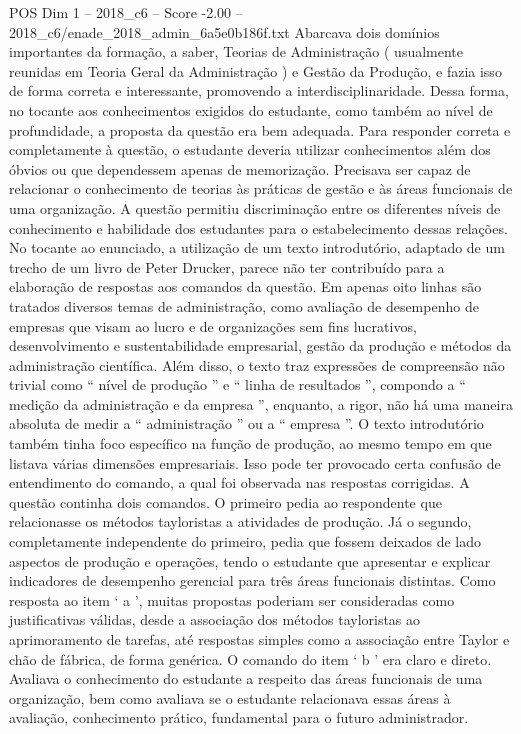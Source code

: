 \begin{textsample}{POS Dim 1 – 2018\_c6 – Score -2.00 – 2018\_c6/enade\_2018\_admin\_6a5e0b186f.txt}
Abarcava dois domínios importantes da formação, a saber, Teorias de Administração ( usualmente reunidas em Teoria Geral da Administração ) e Gestão da Produção, e fazia isso de forma correta e interessante, promovendo a interdisciplinaridade.
Dessa forma, no tocante aos conhecimentos exigidos do estudante, como também ao nível de profundidade, a proposta da questão era bem adequada.
Para responder correta e completamente à questão, o estudante deveria utilizar conhecimentos além dos óbvios ou que dependessem apenas de memorização.
Precisava ser capaz de relacionar o conhecimento de teorias às práticas de gestão e às áreas funcionais de uma organização.
A questão permitiu discriminação entre os diferentes níveis de conhecimento e habilidade dos estudantes para o estabelecimento dessas relações.
No tocante ao enunciado, a utilização de um texto introdutório, adaptado de um trecho de um livro de Peter Drucker, parece não ter contribuído para a elaboração de respostas aos comandos da questão.
Em apenas oito linhas são tratados diversos temas de administração, como avaliação de desempenho de empresas que visam ao lucro e de organizações sem fins lucrativos, desenvolvimento e sustentabilidade empresarial, gestão da produção e métodos da administração científica.
Além disso, o texto traz expressões de compreensão não trivial como “ nível de produção ” e “ linha de resultados ”, compondo a “ medição da administração e da empresa ”, enquanto, a rigor, não há uma maneira absoluta de medir a “ administração ” ou a “ empresa ”.
O texto introdutório também tinha foco específico na função de produção, ao mesmo tempo em que listava várias dimensões empresariais.
Isso pode ter provocado certa confusão de entendimento do comando, a qual foi observada nas respostas corrigidas.
A questão continha dois comandos.
O primeiro pedia ao respondente que relacionasse os métodos tayloristas a atividades de produção.
Já o segundo, completamente independente do primeiro, pedia que fossem deixados de lado aspectos de produção e operações, tendo o estudante que apresentar e explicar indicadores de desempenho gerencial para três áreas funcionais distintas.
Como resposta ao item ‘ a ’, muitas propostas poderiam ser consideradas como justificativas válidas, desde a associação dos métodos tayloristas ao aprimoramento de tarefas, até respostas simples como a associação entre Taylor e chão de fábrica, de forma genérica.
O comando do item ‘ b ’ era claro e direto.
Avaliava o conhecimento do estudante a respeito das áreas funcionais de uma organização, bem como avaliava se o estudante relacionava essas áreas à avaliação, conhecimento prático, fundamental para o futuro administrador.

\end{textsample}
